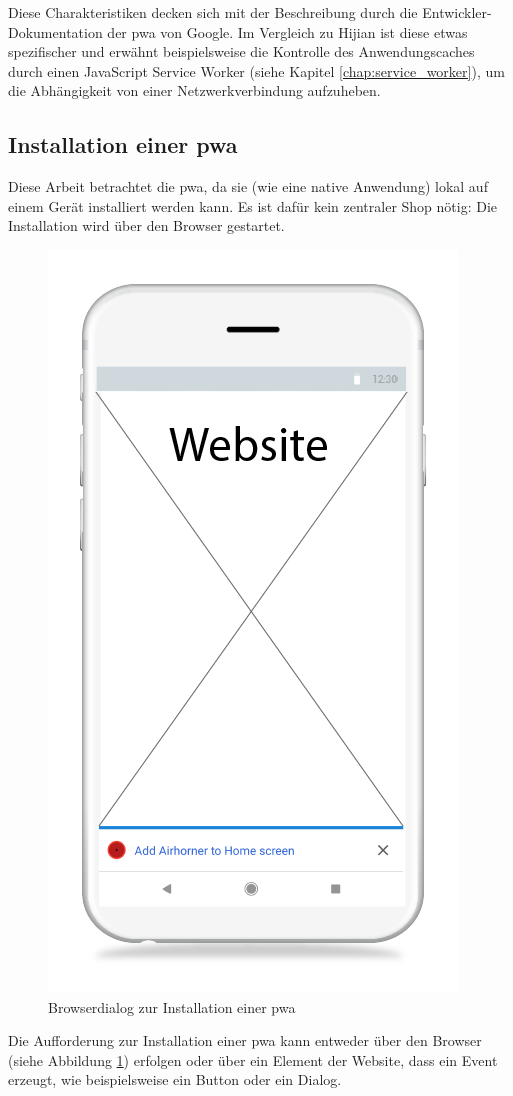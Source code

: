 \cite[S. 1f.]{Hajian2019}
Diese Charakteristiken decken sich mit der Beschreibung durch die Entwickler-Dokumentation der \ac{pwa} von Google. Im Vergleich zu Hijian ist diese etwas spezifischer und erwähnt beispielsweise die Kontrolle des Anwendungscaches durch einen JavaScript Service Worker (siehe Kapitel \ref{chap:service_worker}), um die Abhängigkeit von einer Netzwerkverbindung aufzuheben.
\cite{GooglePWAOverview}

\subsection{Installation einer \acf{pwa}}

Diese Arbeit betrachtet die \ac{pwa}, da sie (wie eine native Anwendung) lokal auf einem Gerät installiert werden kann. Es ist dafür kein zentraler Shop nötig: Die Installation wird über den Browser gestartet.

\begin{figure}[h!]
        \centering
        \includegraphics[width=0.5\linewidth]{img/Wireframe_install_pwa.png}
        \caption{Browserdialog zur Installation einer \ac{pwa} \cite{PWAAddToHomeScreenPrompt}}
        \label{fig:pwainstallationprompt}
\end{figure}

Die Aufforderung zur Installation einer \ac{pwa} kann entweder über den Browser (siehe Abbildung \ref{fig:pwainstallationprompt}) erfolgen oder über ein Element der Website, dass ein Event erzeugt, wie beispielsweise ein Button oder ein Dialog. 

